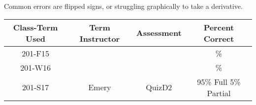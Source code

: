 \begin{outcomes}
Common errors are flipped signs, or struggling graphically to take a derivative.
	\begin{center}
		\begin{tabular}{cccc}
			\hline\hline
			Class-Term Used & Term Instructor & Assessment & Percent Correct\\
			\hline
			201-F15 &  &  & \%\\    %
			201-W16 &  &  & \%\\    %
			201-S17 & Emery & QuizD2 & 95\% Full 5\% Partial\\
			\hline
		\end{tabular}
	\end{center}
\end{outcomes}

\begin{comments}
	
\end{comments}
